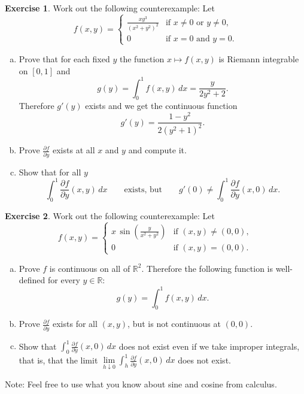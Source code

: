 \documentclass[12pt,openany]{book}
\newcommand{\R}{{\mathbb{R}}}
\theoremstyle{plain}
\theoremstyle{remark}
\theoremstyle{definition}
\newenvironment{exbox}{%
    \def\FrameCommand{\vrule width 1pt \relax\hspace{10pt}}%
    \MakeFramed{\advance\hsize-\width\FrameRestore}%
}{%
    \endMakeFramed
}
\newenvironment{exparts}{%
    \leavevmode\begin{enumerate}[a),noitemsep,topsep=0pt,parsep=0pt,partopsep=0pt]
}{%
    \end{enumerate}
}
\theoremstyle{exercise}
\newtheorem{exercise}{Exercise}[section]
\theoremstyle{example}
\begin{document}
\begin{exbox}
\begin{exercise}
\pagebreak[2]
Work out the following counterexample:  Let
\begin{equation*}
f(x,y) =
\begin{cases}
\frac{xy^3}{{(x^2+y^2)}^2} & \text{if } x\not=0 \text{ or  } y\not= 0,\\
0 & \text{if } x=0 \text{ and } y=0.
\end{cases}
\end{equation*}
\begin{exparts}
\item
Prove that for each fixed $y$ the function $x \mapsto f(x,y)$ is
Riemann integrable on $[0,1]$ and
\begin{equation*}
g(y) = \int_0^1 f(x,y) \, dx = \frac{y}{2y^2+2} .
\end{equation*}
Therefore $g'(y)$ exists and we get the continuous function
\begin{equation*}
g'(y) = \frac{1-y^2}{2{(y^2+1)}^2} .
\end{equation*}
\item
Prove $\frac{\partial f}{\partial y}$ exists at all $x$ and $y$ and
compute it.
\item
Show that for all $y$
\begin{equation*}
\int_0^1 \frac{\partial f}{\partial y} (x,y) \, dx
\qquad
\text{exists, but}
\qquad
g'(0) \not= \int_0^1 \frac{\partial f}{\partial y} (x,0) \, dx .
\end{equation*}
\end{exparts}
\end{exercise}

\begin{exercise}
Work out the following counterexample:  Let
\begin{equation*}
f(x,y) =
\begin{cases}
x \,\sin \left(\frac{y}{x^2+y^2}\right) & \text{if } (x,y) \not= (0,0),\\
0 & \text{if } (x,y)=(0,0).
\end{cases}
\end{equation*}
\begin{exparts}
\item
Prove $f$ is continuous on all of $\R^2$.
Therefore the following function is well-defined for every $y \in \R$:
\begin{equation*}
g(y) = \int_0^1 f(x,y) \, dx .
\end{equation*}
\item
Prove $\frac{\partial f}{\partial y}$ exists for all $(x,y)$,
but is not continuous at $(0,0)$.
\item
Show that $\int_0^1 \frac{\partial f}{\partial y}(x,0) \, dx$ does not
exist even if we take improper integrals, that is,
that the limit
$\lim\limits_{h \downarrow 0} \int_h^1 \frac{\partial f}{\partial y}(x,0) \, dx$
does not exist.
\end{exparts}
Note: Feel free to use what you know about sine and cosine from calculus.
\pagebreak[2]
\end{exercise}


\end{exbox}
\end{document}
